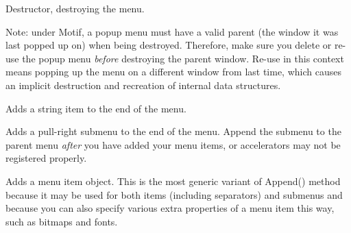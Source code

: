 

Destructor, destroying the menu.

Note: under Motif, a popup menu must have a valid parent (the window
it was last popped up on) when being destroyed. Therefore, make sure
you delete or re-use the popup menu {\it before} destroying the
parent window. Re-use in this context means popping up the menu on
a different window from last time, which causes an implicit destruction
and recreation of internal data structures.

\label{wxmenuappend}


Adds a string item to the end of the menu.


Adds a pull-right submenu to the end of the menu. Append the submenu to the parent
menu {\it after} you have added your menu items, or accelerators may not be
registered properly.


Adds a menu item object. This is the most generic variant of Append() method
because it may be used for both items (including separators) and submenus and
because you can also specify various extra properties of a menu item this way,
such as bitmaps and fonts.








